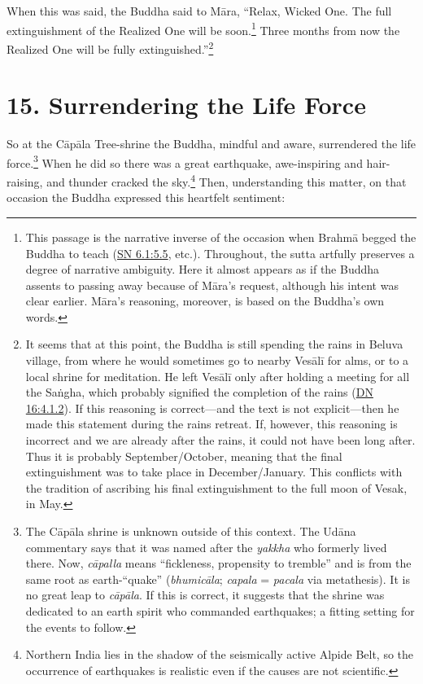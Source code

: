 \documentclass[12pt,openany]{book}%
\begin{document}
When this was said, the Buddha said to \textsanskrit{Māra}, “Relax, Wicked One. The full extinguishment of the Realized One will be soon.\footnote{This passage is the narrative inverse of the occasion when \textsanskrit{Brahmā} begged the Buddha to teach (\href{https://suttacentral.net/sn6.1/en/sujato\#5.5}{SN 6.1:5.5}, etc.). Throughout, the sutta artfully preserves a degree of narrative ambiguity. Here it almost appears as if the Buddha assents to passing away because of \textsanskrit{Māra}’s request, although his intent was clear earlier. \textsanskrit{Māra}’s reasoning, moreover, is based on the Buddha’s own words. } Three months from now the Realized One will be fully extinguished.”\footnote{It seems that at this point, the Buddha is still spending the rains in Beluva village, from where he would sometimes go to nearby \textsanskrit{Vesālī} for alms, or to a local shrine for meditation. He left \textsanskrit{Vesālī} only after holding a meeting for all the \textsanskrit{Saṅgha}, which probably signified the completion of the rains (\href{https://suttacentral.net/dn16/en/sujato\#4.1.2}{DN 16:4.1.2}). If this reasoning is correct—and the text is not explicit—then he made this statement during the rains retreat. If, however, this reasoning is incorrect and we are already after the rains, it could not have been long after. Thus it is probably September/October, meaning that the final extinguishment was to take place in December/January. This conflicts with the tradition of ascribing his final extinguishment to the full moon of Vesak, in May. } 

\section*{15. Surrendering the Life Force }

So at the \textsanskrit{Cāpāla} Tree-shrine the Buddha, mindful and aware, surrendered the life force.\footnote{The \textsanskrit{Cāpāla} shrine is unknown outside of this context. The \textsanskrit{Udāna} commentary says that it was named after the \textit{yakkha} who formerly lived there. Now, \textit{\textsanskrit{cāpalla}} means “fickleness, propensity to tremble” and is from the same root as earth-“quake” (\textit{\textsanskrit{bhumicāla}}; \textit{capala} = \textit{pacala} via metathesis). It is no great leap to \textit{\textsanskrit{cāpāla}}. If this is correct, it suggests that the shrine was dedicated to an earth spirit who commanded earthquakes; a fitting setting for the events to follow. } When he did so there was a great earthquake, awe-inspiring and hair-raising, and thunder cracked the sky.\footnote{Northern India lies in the shadow of the seismically active Alpide Belt, so the occurrence of earthquakes is realistic even if the causes are not scientific. } Then, understanding this matter, on that occasion the Buddha expressed this heartfelt sentiment: 
\end{document}
